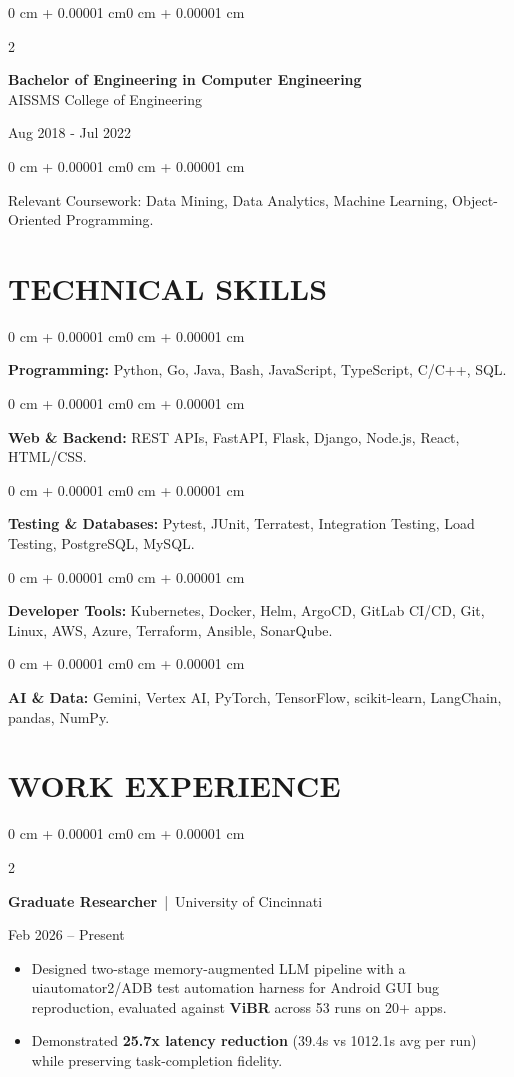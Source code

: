 \documentclass[10pt, letterpaper]{article}
\newenvironment{highlights}{
    \begin{itemize}[
        topsep=0.10 cm,
        parsep=0.06 cm,
        partopsep=0pt,
        itemsep=0.06 cm,
        leftmargin=12pt
    ]
}{
    \end{itemize}
}
\newenvironment{onecolentry}{
    \begin{adjustwidth}{0 cm + 0.00001 cm}{0 cm + 0.00001 cm}
}{
    \end{adjustwidth}
}
\newenvironment{twocolentry}[2][]{
    \onecolentry
    \def\secondColumn{#2}
    \setcolumnwidth{\fill, 4.5 cm}
    \begin{paracol}{2}
}{
    \switchcolumn \raggedleft \secondColumn
    \end{paracol}
    \endonecolentry
}
\begin{document}
\begin{twocolentry}{
    Aug 2018 - Jul 2022
}
    \textbf{Bachelor of Engineering in Computer Engineering} \\
    AISSMS College of Engineering
\end{twocolentry}
\begin{onecolentry}
Relevant Coursework: Data Mining, Data Analytics, Machine Learning, Object-Oriented Programming.
\end{onecolentry}
\section{TECHNICAL SKILLS}
\begin{onecolentry}
\textbf{Programming:} Python, Go, Java, Bash, JavaScript, TypeScript, C/C++, SQL.
\end{onecolentry}
\vspace{0.06 cm}
\begin{onecolentry}
\textbf{Web \& Backend:} REST APIs, FastAPI, Flask, Django, Node.js, React, HTML/CSS.
\end{onecolentry}
\vspace{0.06 cm}
\begin{onecolentry}
\textbf{Testing \& Databases:} Pytest, JUnit, Terratest, Integration Testing, Load Testing, PostgreSQL, MySQL.
\end{onecolentry}
\vspace{0.06 cm}
\begin{onecolentry}
\textbf{Developer Tools:} Kubernetes, Docker, Helm, ArgoCD, GitLab CI/CD, Git, Linux, AWS, Azure, Terraform, Ansible, SonarQube.
\end{onecolentry}
\vspace{0.06 cm}
\begin{onecolentry}
\textbf{AI \& Data:} Gemini, Vertex AI, PyTorch, TensorFlow, scikit-learn, LangChain, pandas, NumPy.
\end{onecolentry}

\section{WORK EXPERIENCE}
\begin{twocolentry}{Feb 2026 -- Present}
\textbf{Graduate Researcher} \,|\, University of Cincinnati
\end{twocolentry}
\begin{highlights}
  \item Designed two-stage memory-augmented LLM pipeline with a uiautomator2/ADB test automation harness for Android GUI bug reproduction, evaluated against \textbf{ViBR} across 53 runs on 20+ apps.
  \item Demonstrated \textbf{25.7x latency reduction} (39.4s vs 1012.1s avg per run) while preserving task-completion fidelity.
\end{highlights}
\end{document}
